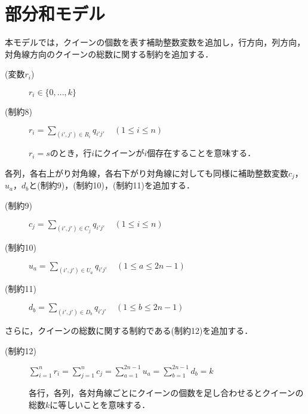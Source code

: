 \section{部分和モデル}
本モデルでは，クイーンの個数を表す補助整数変数を追加し，行方向，列方向，対角線方向のクイーンの総数に関する制約を追加する．
\begin{description}
 \item[(変数$r_i$)] $r_{i} \in \{0,...,k\}$ 
 \item[(制約8)] $r_{i} = \sum\limits _{(i',j') \in R_{i}} q_{i'j'} \;\;\;\;(1 \leq i \leq n)$ \par
$r_i = s$のとき，行$i$にクイーンが$i$個存在することを意味する．
\end{description}
各列，各右上がり対角線，各右下がり対角線に対しても同様に補助整数変数$c_j$，$u_{a}$，$d_{b}$と(制約9)，(制約10)，(制約11)を追加する．
\begin{description}
 \item[(制約9)] $c_{j} = \sum\limits _{(i',j') \in C_{j}} q_{i'j'} \;\;\;\;(1 \leq i \leq n)$
 \item[(制約10)] $u_{a} = \sum\limits _{(i',j') \in U_{a}} q_{i'j'} \;\;\;\;(1 \leq a \leq 2n-1)$
 \item[(制約11)] $d_{b} = \sum\limits _{(i',j') \in D_{b}} q_{i'j'} \;\;\;\;(1 \leq b \leq 2n-1)$
\end{description}
さらに，クイーンの総数に関する制約である(制約12)を追加する．
\begin{description}
 \item[(制約12)] $\sum\limits_{i=1}^{n} r_{i} = \sum\limits_{j=1}^{n} c_{j} =\sum\limits_{a=1}^{2n-1} u_{a} =\sum\limits_{b=1}^{2n-1} d_{b} = k$ \par
各行，各列，各対角線ごとにクイーンの個数を足し合わせるとクイーンの総数$k$に等しいことを意味する．
\end{description}